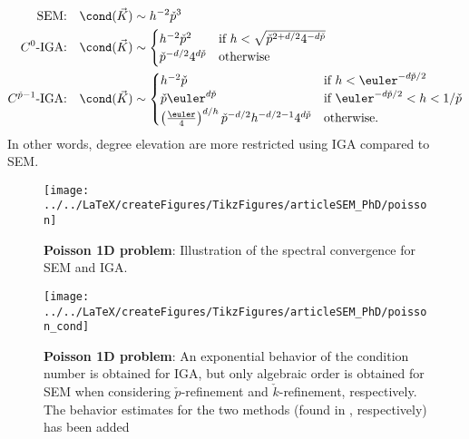 \begin{align}\label{Eq5:condSEM}
	\text{SEM:}\quad&\cond(\vec{K}) \sim h^{-2}\check{p}^3\\ \label{Eq5:condIGA1}
	C^0\text{-IGA:}\quad&\cond(\vec{K}) \sim \begin{cases}
		h^{-2}\check{p}^2 & \text{if } h < \sqrt{\check{p}^{2+d/2}4^{-d\check{p}}}\\
		\check{p}^{-d/2}4^{d\check{p}} & \text{otherwise}
		\end{cases}\\ \label{Eq5:condIGA2}
	C^{\check{p}-1}\text{-IGA:}\quad&\cond(\vec{K}) \sim \begin{cases}
		h^{-2}\check{p} & \text{if } h < \euler^{-d\check{p}/2}\\
		\check{p}\euler^{d\check{p}} & \text{if } \euler^{-d\check{p}/2} < h < 1/\check{p}\\
		\left(\frac{\euler}{4}\right)^{d/h}\check{p}^{-d/2}h^{-d/2-1}4^{d\check{p}} & \text{otherwise.}
		\end{cases}
\end{align}
In other words, degree elevation are more restricted using IGA compared to SEM.
\begin{figure}
	\centering
	\texttt{[image: ../../LaTeX/createFigures/TikzFigures/articleSEM\_PhD/poisson]}
	\caption{\textbf{Poisson 1D problem}: Illustration of the spectral convergence for SEM and IGA.}
	\label{Fig5:poisson}
\end{figure}
\begin{figure}
	\centering
	\texttt{[image: ../../LaTeX/createFigures/TikzFigures/articleSEM\_PhD/poisson\_cond]}
	\caption{\textbf{Poisson 1D problem}: An exponential behavior of the condition number is obtained for IGA, but only algebraic order is obtained for SEM when considering $\check{p}$-refinement and $\check{k}$-refinement, respectively. The behavior estimates for the two methods (found in , respectively) has been added}
	\label{Fig5:poisson_cond}
\end{figure}

